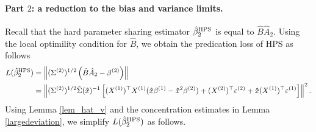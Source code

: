 \paragraph{Part $2$: a reduction to the bias and variance limits.}
Recall that the hard parameter sharing estimator $\hat{\beta}_2^{\textup{HPS}}$ is equal to $\hat{B} \hat{A}_2$.
Using the local optimility condition for $\hat{B}$, we obtain the predication loss of HPS as follows
\begin{align}
L(\hat{\beta}_2^{\textup{HPS}}) &=\left\|(\Sigma^{(2)})^{1/2} \left( \hat B \hat A_2 - \beta^{(2)}\right)\right\| \nonumber\\
&=  \left\| (\Sigma^{(2)})^{1/2}\hat \Sigma(\hat x)^{-1} \left[(X^{(1)})^\top X^{(1)} (\hat x\beta^{(1)}-\hat x^2\beta^{(2)})+ (X^{(2)})^\top \varepsilon^{(2)} + \hat x   (X^{(1)})^\top \varepsilon^{(1)} \right]\right\|^2.\label{Lbeta_HPS}
\end{align}
Using Lemma \ref{lem_hat_v} and the concentration estimates in Lemma \ref{largedeviation}, we simplify $L(\hat{\beta}_2^{\textup{HPS}})$ as follows.

